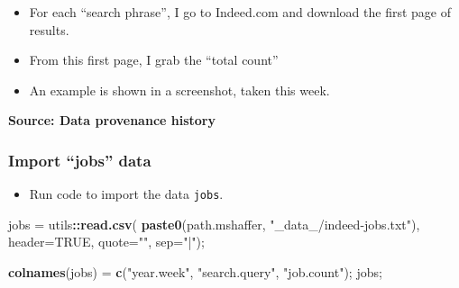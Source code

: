 \documentclass[
]{article}
\newenvironment{Shaded}{\begin{snugshade}}{\end{snugshade}}
\newcommand{\DataTypeTok}[1]{\textcolor[rgb]{0.13,0.29,0.53}{#1}}
\newcommand{\KeywordTok}[1]{\textcolor[rgb]{0.13,0.29,0.53}{\textbf{#1}}}
\newcommand{\NormalTok}[1]{#1}
\newcommand{\OperatorTok}[1]{\textcolor[rgb]{0.81,0.36,0.00}{\textbf{#1}}}
\newcommand{\OtherTok}[1]{\textcolor[rgb]{0.56,0.35,0.01}{#1}}
\newcommand{\StringTok}[1]{\textcolor[rgb]{0.31,0.60,0.02}{#1}}
\providecommand{\tightlist}{%
  \setlength{\itemsep}{0pt}\setlength{\parskip}{0pt}}
\begin{document}
\begin{itemize}
\tightlist
\item
  For each ``search phrase'', I go to Indeed.com and download the first
  page of results.\\
\item
  From this first page, I grab the ``total count''
\item
  An example is shown in a screenshot, taken this week.
\end{itemize}

\textbf{Source: Data provenance history}

\hypertarget{import-jobs-data}{%
\subsubsection{Import ``jobs'' data}\label{import-jobs-data}}

\begin{itemize}
\tightlist
\item
  Run code to import the data \texttt{jobs}.
\end{itemize}

\begin{Shaded}
\begin{Highlighting}[]
\NormalTok{jobs =}\StringTok{ }\NormalTok{utils}\OperatorTok{::}\KeywordTok{read.csv}\NormalTok{( }\KeywordTok{paste0}\NormalTok{(path.mshaffer, }\StringTok{"\_data\_/indeed{-}jobs.txt"}\NormalTok{), }\DataTypeTok{header=}\OtherTok{TRUE}\NormalTok{, }\DataTypeTok{quote=}\StringTok{""}\NormalTok{, }\DataTypeTok{sep=}\StringTok{"|"}\NormalTok{);}

\KeywordTok{colnames}\NormalTok{(jobs) =}\StringTok{ }\KeywordTok{c}\NormalTok{(}\StringTok{"year.week"}\NormalTok{, }\StringTok{"search.query"}\NormalTok{, }\StringTok{"job.count"}\NormalTok{);}
\NormalTok{jobs;}
\end{Highlighting}
\end{Shaded}
\end{document}
